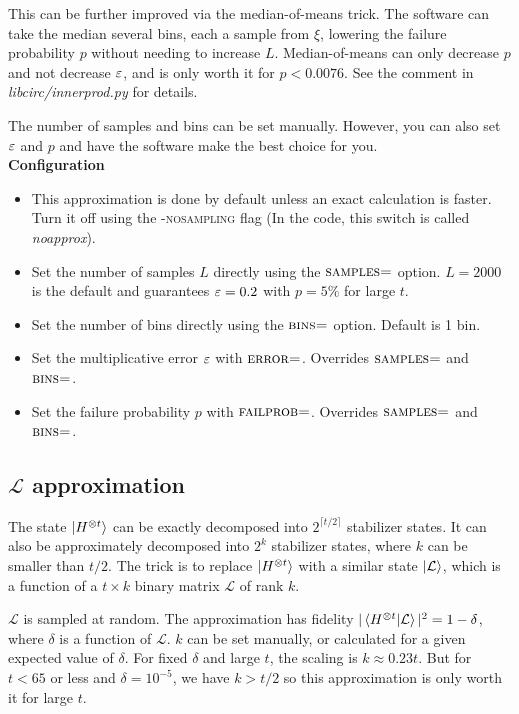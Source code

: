 \documentclass[11pt]{article}
\begin{document}
This can be further improved via the median-of-means trick. The software can take the median several bins, each a sample from $\xi$, lowering the failure probability $p$ without needing to increase $L$. Median-of-means can only decrease $p$ and not decrease $\varepsilon$, and is only worth it for $p < 0.0076$. See the comment in \textit{libcirc/innerprod.py} for details.

The number of samples and bins can be set manually. However, you can also set $\varepsilon$ and $p$ and have the software make the best choice for you.\\

\noindent \textbf{Configuration}
\begin{itemize}
    \item This approximation is done by default unless an exact calculation is faster. Turn it off using the \textsc{-nosampling} flag (In the code, this switch is called \textit{noapprox}).
    \item Set the number of samples $L$ directly using the $\textsc{samples=}$ option. $L=2000$ is the default and guarantees $\varepsilon = 0.2$ with $p = 5\%$ for large $t$.
    \item Set the number of bins directly using the $\textsc{bins=}$ option. Default is 1 bin.
    \item Set the multiplicative error $\varepsilon$ with $\textsc{error=}$. Overrides $\textsc{samples=}$ and $\textsc{bins=}$.
    \item Set the failure probability $p$ with $\textsc{failprob=}$. Overrides $\textsc{samples=}$ and $\textsc{bins=}$.
\end{itemize}

\subsection{$\mathcal{L}$ approximation} \label{sec:msa}

The state $\ket{H^{\otimes t}}$ can be exactly decomposed into $2^{\lceil t/2\rceil}$ stabilizer states. It can also be approximately decomposed into  $2^{k}$ stabilizer states, where $k$ can be smaller than $t/2$. The trick is to replace $\ket{H^{\otimes t}}$ with a similar state $\ket{\mathcal{L}}$, which is a function of a $t \times k$ binary matrix $\mathcal{L}$ of rank $k$. 

$\mathcal{L}$ is sampled at random. The approximation has fidelity $|\braket{H^{\otimes t}|\mathcal{L}}|^2 = 1-\delta$, where $\delta$ is a function of $\mathcal{L}$. $k$ can be set manually, or calculated for a given expected value of $\delta$. For fixed $\delta$ and large $t$, the scaling is $k \approx 0.23 t$. But for $t < 65$ or less and $\delta = 10^{-5}$, we have $k > t/2$ so this approximation is only worth it for large $t$.
\end{document}
